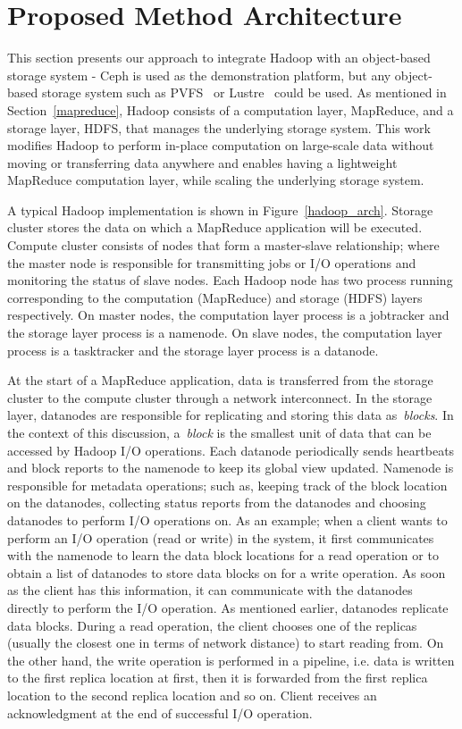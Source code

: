 \documentclass[preprint,12pt]{elsarticle}
\begin{document}
\section{Proposed Method Architecture}
\label{proposedmethod}
This section presents our approach to integrate Hadoop with
an object-based storage system - Ceph is used as the demonstration
platform, but any object-based storage system such as PVFS~\cite{Carns:2000:PPF:1268379.1268407} or
Lustre~\cite{lustre_web} could be used.
As mentioned in Section~\ref{mapreduce},
Hadoop consists of a computation layer, MapReduce, and a
storage layer, HDFS, that manages the underlying storage system. This
work modifies Hadoop to perform in-place
computation on large-scale data without moving or transferring data
anywhere and enables having a lightweight MapReduce computation layer,
while scaling the underlying storage system. 

A typical Hadoop implementation is shown in Figure~\ref{hadoop_arch}. Storage cluster
stores the data on which a MapReduce application will be executed. Compute cluster
consists of nodes that form a master-slave relationship; where the master node is
responsible for transmitting jobs or I/O operations and monitoring the status of
slave nodes. Each Hadoop node has two process running corresponding to the computation (MapReduce)
and storage (HDFS) layers respectively. On master nodes, the computation layer
process is a jobtracker and the storage layer process is a namenode. On slave nodes,
the computation layer process is a tasktracker and the storage layer process is a
datanode.

At the start of a MapReduce application, data is transferred from the storage cluster
to the compute cluster through a network interconnect. In the storage layer, datanodes
are responsible for replicating and storing this data as~\textit{blocks}. In the context
of this discussion, a~\textit{block} is the smallest unit of data that can be accessed
by Hadoop I/O operations. Each datanode periodically sends heartbeats and block reports
to the namenode to keep its global view updated. Namenode is responsible for metadata
operations; such as, keeping track
of the block location on the datanodes, collecting status reports from the datanodes and
choosing datanodes to perform I/O operations on. As an example; when a client wants to
perform an I/O operation (read or write) in the system, it first communicates with the
namenode to learn the data block locations for a read operation or to obtain a list of
datanodes to store data blocks on for a write operation. As soon as the client has this
information, it can communicate with the datanodes directly to perform the I/O operation.
As mentioned earlier, datanodes replicate data blocks. During a read operation, the client
chooses one of the replicas (usually the closest one in terms of network distance) to
start reading from. On the other hand, the write operation is performed in a pipeline, i.e.
data is written to the first replica location at first, then it is forwarded from the first
replica location to the second replica location and so on. Client receives an acknowledgment
at the end of successful I/O operation.
 
\end{document}
